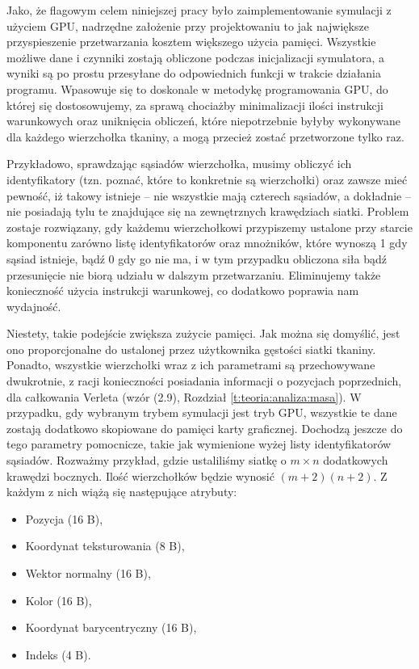 	Jako, że flagowym celem niniejszej pracy było zaimplementowanie symulacji z użyciem GPU, nadrzędne założenie przy projektowaniu to jak największe przyspieszenie przetwarzania kosztem większego użycia pamięci. Wszystkie możliwe dane i czynniki zostają obliczone podczas inicjalizacji symulatora, a wyniki są po prostu przesyłane do odpowiednich funkcji w trakcie działania programu. Wpasowuje się to doskonale w metodykę programowania GPU, do której się dostosowujemy, za sprawą chociażby minimalizacji ilości instrukcji warunkowych oraz uniknięcia obliczeń, które niepotrzebnie byłyby wykonywane dla każdego wierzchołka tkaniny, a mogą przecież zostać przetworzone tylko raz. 
	
	Przykładowo, sprawdzając sąsiadów wierzchołka, musimy obliczyć ich identyfikatory (tzn. poznać, które to konkretnie są wierzchołki) oraz zawsze mieć pewność, iż takowy istnieje -- nie wszystkie mają czterech sąsiadów, a dokładnie -- nie posiadają tylu te znajdujące się na zewnętrznych krawędziach siatki. Problem zostaje rozwiązany, gdy każdemu wierzchołkowi przypiszemy ustalone przy starcie komponentu zarówno listę identyfikatorów oraz mnożników, które wynoszą 1 gdy sąsiad istnieje, bądź 0 gdy go nie ma, i w tym przypadku obliczona siła bądź przesunięcie nie biorą udziału w dalszym przetwarzaniu. Eliminujemy także konieczność użycia instrukcji warunkowej, co dodatkowo poprawia nam wydajność. 
	
	Niestety, takie podejście zwiększa zużycie pamięci. Jak można się domyślić, jest ono proporcjonalne do ustalonej przez użytkownika gęstości siatki tkaniny. Ponadto, wszystkie wierzchołki wraz z ich parametrami są przechowywane dwukrotnie, z racji konieczności posiadania informacji o pozycjach poprzednich, dla całkowania Verleta (wzór (2.9), Rozdział \ref{t:teoria:analiza:masa}). W przypadku, gdy wybranym trybem symulacji jest tryb GPU, wszystkie te dane zostają dodatkowo skopiowane do pamięci karty graficznej. Dochodzą jeszcze do tego parametry pomocnicze, takie jak wymienione wyżej listy identyfikatorów sąsiadów. Rozważmy przykład, gdzie ustaliliśmy siatkę o \(m \times n\) dodatkowych krawędzi bocznych. Ilość wierzchołków będzie wynosić \( (m + 2)(n + 2) \). Z każdym z nich wiążą się następujące atrybuty:
	
	\begin{itemize}
		\item Pozycja (16 B),
		\item Koordynat teksturowania (8 B),
		\item Wektor normalny (16 B),
		\item Kolor (16 B),
		\item Koordynat barycentryczny (16 B),
		\item Indeks (4 B).
	\end{itemize}
	
